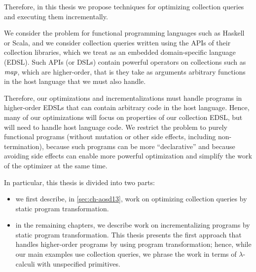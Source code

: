 Therefore, in this thesis we propose techniques for optimizing collection
queries and executing them incrementally.

We consider the problem for functional programming languages such as Haskell or
Scala, and we consider collection queries written using the APIs of their
collection libraries, which we treat as an embedded domain-specific language (EDSL). Such
APIs (or DSLs) contain powerful operators on collections such as $\mathit{map}$,
which are higher-order, that
is they take as arguments arbitrary functions in the host language that we must
also handle.

Therefore, our optimizations and incrementalizations must handle programs in
higher-order EDSLs that can contain arbitrary code in the host language. Hence,
many of our optimizations will focus
on properties of our collection EDSL, but
will need to handle host language code. We restrict the problem to purely
functional programs (without mutation or other side effects, including
non-termination), because such programs can be more ``declarative'' and because
avoiding side effects can enable more powerful optimization and simplify the
work of the optimizer at the same time.

In particular, this thesis is divided into two parts:
\begin{itemize}
\item we first describe, in \cref{sec:ch-aosd13}, work on optimizing collection queries by static program transformation.
\item in the remaining chapters, we describe work on incrementalizing programs
  by static program transformation. This thesis presents the first approach that
  handles higher-order programs by using program transformation; hence, while
  our main examples use collection queries, we phrase the work in terms of
  $\lambda$-calculi with unspecified primitives.
\end{itemize}



